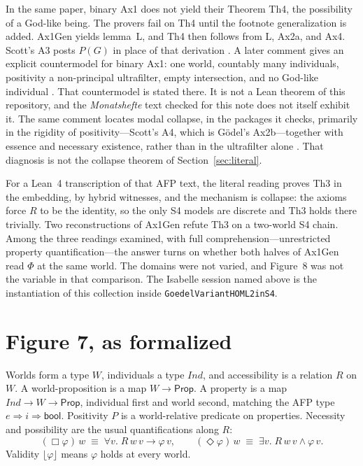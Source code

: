 \documentclass[11pt,a4paper]{article}
\newcommand{\valid}[1]{\lfloor #1 \rfloor}
\newcommand{\Nec}{\Box}
\newcommand{\Pos}{\Diamond}
\newcommand{\lean}[1]{\texttt{#1}}
\theoremstyle{definition}
\theoremstyle{remark}
\begin{document}
In the same paper, binary Ax1 does not yield their Theorem Th4, the
possibility of a God-like being.
The provers fail on Th4 until the footnote generalization is added.
Ax1Gen yields lemma~L, and Th4 then follows from L, Ax2a, and Ax4.
Scott's A3 posts \(P(G)\) in place of that derivation
\cite{benzmuellerScott2025,afpNotes2025}.
A later comment gives an explicit countermodel for binary Ax1: one world,
countably many individuals, positivity a non-principal ultrafilter, empty
intersection, and no God-like individual \cite{benzmueller2026}.
That countermodel is stated there.
It is not a Lean theorem of this repository, and the \emph{Monatshefte} text
checked for this note does not itself exhibit it.
The same comment locates modal collapse, in the packages it checks, primarily
in the rigidity of positivity---Scott's A4, which is G\"odel's Ax2b---together
with essence and necessary existence, rather than in the ultrafilter alone
\cite{benzmueller2026}.
That diagnosis is not the collapse theorem of Section~\ref{sec:literal}.

For a Lean~4 transcription of that AFP text, the literal reading proves Th3
in the embedding, by hybrid witnesses, and the mechanism is collapse: the axioms force \(R\) to be the identity, so
the only S4 models are discrete and Th3 holds there trivially.
Two reconstructions of Ax1Gen refute Th3 on a two-world S4 chain.
Among the three readings examined, with full comprehension---unrestricted
property quantification---the answer turns on whether both halves of Ax1Gen
read \(\Phi\) at the same world.
The domains were not varied, and Figure~8 was not the variable in that
comparison.
The Isabelle session named above is the instantiation of this collection
inside \lean{GoedelVariantHOML2inS4}.

\section{Figure 7, as formalized}
\label{sec:fig7}

Worlds form a type \(W\), individuals a type \(\mathit{Ind}\), and
accessibility is a relation \(R\) on \(W\).
A world-proposition is a map \(W \to \mathsf{Prop}\).
A property is a map \(\mathit{Ind} \to W \to \mathsf{Prop}\), individual first
and world second, matching the AFP type \(e \Rightarrow i \Rightarrow
\mathsf{bool}\).
Positivity \(P\) is a world-relative predicate on properties.
Necessity and possibility are the usual quantifications along \(R\):
\[
  (\Nec\varphi)\,w \;\equiv\; \forall v.\; R\,w\,v \to \varphi\,v,
  \qquad
  (\Pos\varphi)\,w \;\equiv\; \exists v.\; R\,w\,v \land \varphi\,v.
\]
Validity \(\valid{\varphi}\) means \(\varphi\) holds at every world.
\end{document}
